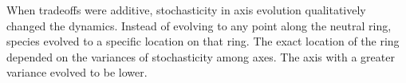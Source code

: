 When tradeoffs were additive, stochasticity in axis evolution qualitatively changed
the dynamics.
Instead of evolving to any point along the neutral ring, species evolved to a specific
location on that ring.
The exact location of the ring depended on the variances of stochasticity among axes.
The axis with a greater variance evolved to be lower.








